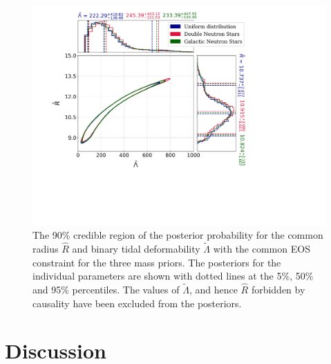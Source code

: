 \begin{figure}[t]
  \includegraphics[width=\columnwidth]{figures/common_eos/Radius_lambda_bothspins.pdf}
  \caption{The 90\% credible region of the posterior probability for the common radius $\hat{R}$ and binary tidal deformability $\tilde\Lambda$ with the common EOS constraint for the three mass priors. The posteriors for the individual parameters are shown with dotted lines at  the 5$\%$, 50$\%$ and 95$\%$ percentiles. The values of $\tilde\Lambda$, and hence $\hat{R}$ forbidden by causality have been excluded from the posteriors. 
\label{fig:radius_lambda}%
}
\end{figure}

%

\section{Discussion}


